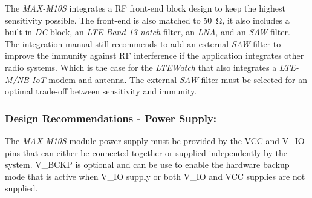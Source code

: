 \documentclass[report.tex]{subfiles}
\begin{document}
The \textit{MAX-M10S} integrates a RF front-end block design to keep the highest sensitivity possible. The front-end is also matched to \SI{50}{\ohm}, it also includes a built-in \textit{DC} block, an \textit{LTE Band 13 notch} filter, an \textit{LNA}, and an \textit{SAW} filter.\\

The integration manual still recommends to add an external \textit{SAW} filter to improve the
immunity against RF interference if the application integrates other radio systems. Which is the case for the \textit{LTEWatch} that also integrates a \textit{LTE-M/NB-IoT} modem and antenna. The external \textit{SAW} filter must be selected for an optimal trade-off between sensitivity and immunity.

\subsubsection{Design Recommendations - Power Supply:} \label{sec:gnss_rcvr_sel}
The \textit{MAX-M10S} module power supply must be provided by the VCC and V\_IO pins that can either be connected together or supplied independently  by the system. V\_BCKP is optional and can be use to enable the hardware backup mode that is active when V\_IO supply or both V\_IO and VCC supplies are not supplied.
\end{document}

